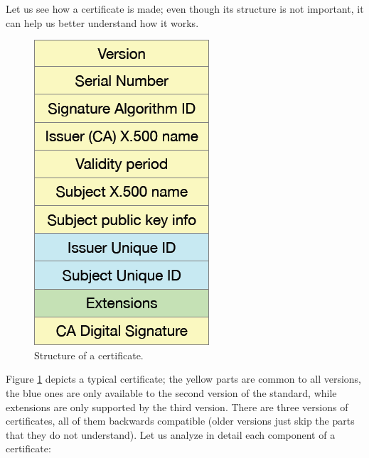Let us see how a certificate is made; even though its structure is not important, it can help us better understand how it works.

\begin{figure}[h]
    \centering
    \includegraphics[scale=0.5]{img/ca_structure.png}
    \decoRule
    \caption{Structure of a certificate.}
    \label{fig:ca_structure}
\end{figure}

Figure \ref{fig:ca_structure} depicts a typical certificate; the yellow parts are common to all versions, the blue ones are only available to the second version of the standard, while extensions are only supported by the third version. There are three versions of certificates, all of them backwards compatible (older versions just skip the parts that they do not understand). Let us analyze in detail each component of a certificate:

